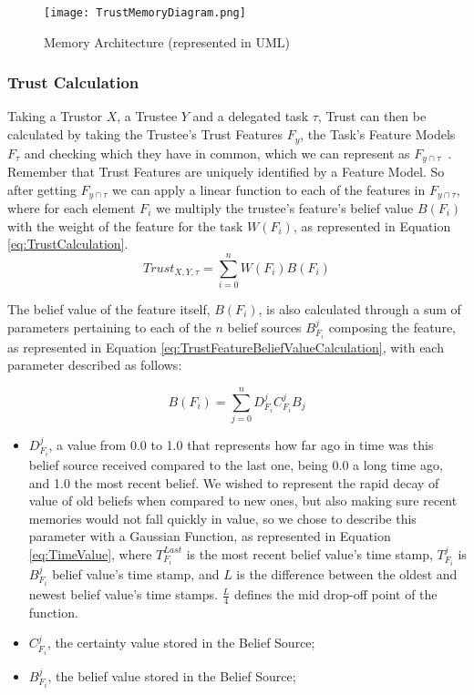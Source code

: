 \begin{figure}[hbt]
    \centering
    \texttt{[image: TrustMemoryDiagram.png]}
    \caption{Memory Architecture (represented in UML)}
    \label{fig:MemoryArchitecture}
\end{figure}


\subsubsection{Trust Calculation}
Taking a Trustor $X$, a Trustee $Y$ and a delegated task $\tau$, Trust can then be calculated by taking the Trustee's Trust Features $F_y$, the Task's Feature Models $F_\tau$ and checking which they have in common, which we can represent as $F_{y\cap\tau}$~. Remember that Trust Features are uniquely identified by a Feature Model. So after getting $F_{y\cap\tau}$ we can apply a linear function to each of the features in $F_{y\cap\tau}$, where for each element $F_i$ we multiply the trustee's feature's belief value $B(F_i)$ with the weight of the feature for the task $W(F_i)$, as represented in Equation \ref{eq:TrustCalculation}.
\begin{equation}
    Trust_{X,Y,\tau}=\sum_{i=0}^{n}W(F_i) B(F_i)
    \label{eq:TrustCalculation}
\end{equation}

The belief value of the feature itself, $B(F_i)$, is also calculated through a sum of parameters pertaining to each of the $n$ belief sources $B_{F_i}^j$ composing the feature, as represented in Equation \ref{eq:TrustFeatureBeliefValueCalculation}, with each parameter described as follows: 

\begin{equation}
B(F_i) = \sum_{j=0}^{n} D^j_{F_i} C^j_{F_i} B_j 
\label{eq:TrustFeatureBeliefValueCalculation}
\end{equation}

\begin{itemize}
    \item $D^j_{F_i}$, a value from 0.0 to 1.0 that represents how far ago in time was this belief source received compared to the last one, being 0.0 a long time ago, and 1.0 the most recent belief. We wished to represent the rapid decay of value of old beliefs when compared to new ones, but also making sure recent memories would not fall quickly in value, so we chose to describe this parameter with a Gaussian Function, as represented in Equation \ref{eq:TimeValue}, where $T^{Last}_{F_i}$ is the most recent belief value's time stamp, $T^j_{F_i}$ is $B_{F_i}^j$ belief value's time stamp, and $L$ is the difference between the oldest and newest belief value's time stamps. $\frac{L}{4}$ defines the mid drop-off point of the function.
    \item $C^j_{F_i}$, the certainty value stored in the Belief Source;
    \item $B^j_{F_i}$, the belief value stored in the Belief Source;
\end{itemize}


